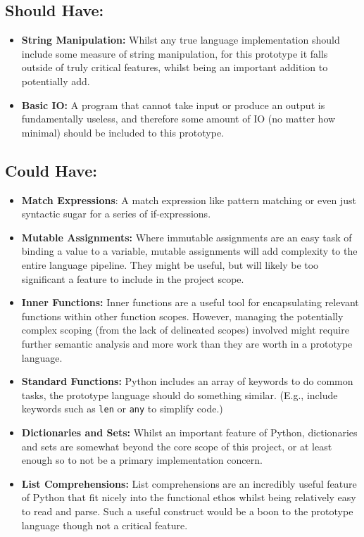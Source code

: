 \documentclass{l4proj}
\begin{document}
\subsection*{Should Have:}
\begin{itemize}
    \item \textbf{String Manipulation:} Whilst any true language implementation should include some measure of string manipulation, for this prototype it falls outside of truly critical features, whilst being an important addition to potentially add.
    \item \textbf{Basic IO:} A program that cannot take input or produce an output is fundamentally useless, and therefore some amount of IO (no matter how minimal) should be included to this prototype.
\end{itemize}

\subsection*{Could Have:}
\begin{itemize}
    \item \textbf{Match Expressions}: A match expression like pattern matching or even just syntactic sugar for a series of if-expressions.
    \item \textbf{Mutable Assignments:} Where immutable assignments are an easy task of binding a value to a variable, mutable assignments will add complexity to the entire language pipeline.
    They might be useful, but will likely be too significant a feature to include in the project scope.
    \item \textbf{Inner Functions:} Inner functions are a useful tool for encapsulating relevant functions within other function scopes.
    However, managing the potentially complex scoping (from the lack of delineated scopes) involved might require further semantic analysis and more work than they are worth in a prototype language.
    \item \textbf{Standard Functions:} Python includes an array of keywords to do common tasks, the prototype language should do something similar.
    (E.g., include keywords such as \verb|len| or \verb|any| to simplify code.)
    \item \textbf{Dictionaries and Sets:} Whilst an important feature of Python, dictionaries and sets are somewhat beyond the core scope of this project, or at least enough so to not be a primary implementation concern.
    \item \textbf{List Comprehensions:} List comprehensions are an incredibly useful feature of Python that fit nicely into the functional ethos whilst being relatively easy to read and parse.
    Such a useful construct would be a boon to the prototype language though not a critical feature.
\end{itemize}
\end{document}

